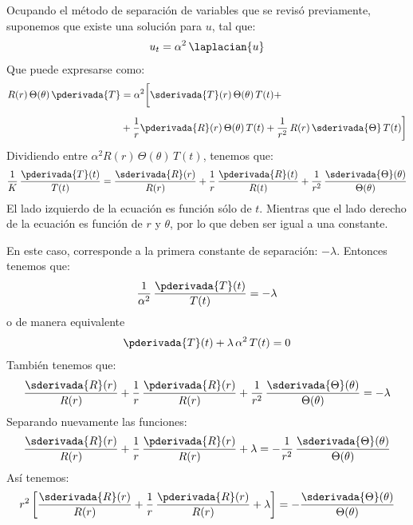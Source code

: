 Ocupando el método de separación de variables que se revisó previamente, suponemos que existe una solución para $u$, tal que:
\begin{align*}
u_{t} = \alpha^{2} \, \laplacian{u}
\end{align*}
Que puede expresarse como:
\begin{align*}
R(r) \, \Theta (\theta) \, \pderivada{T} &= \alpha^{2} \bigg[ \sderivada{T} (r) \, \Theta (\theta) \, T(t) + \\[0.5em]
&+ \dfrac{1}{r} \pderivada{R} (r) \, \Theta(\theta) \, T(t) + \dfrac{1}{r^{2}} \, R(r) \, \sderivada{\Theta} \, T(t) \bigg]
\end{align*}
Dividiendo entre $\alpha^{2} R(r) \, \Theta (\theta) \, T(t)$, tenemos que:
\begin{align}
\dfrac{1}{K} \, \dfrac{\pderivada{T} (t)}{T (t)} = \dfrac{\sderivada{R} (r)}{R (r)} + \dfrac{1}{r} \, \dfrac{\pderivada{R} (t)}{R (t)} + \dfrac{1}{r^{2}} \, \dfrac{\sderivada{\Theta} (\theta)}{\Theta (\theta)}
\label{eq:ecuacion_K01}
\end{align}
El lado izquierdo de la ecuación es función sólo de $t$. Mientras que el lado derecho de la ecuación es función de $r$ y $\theta$, por lo que deben ser igual a una constante.
\par
En este caso, corresponde a la primera constante de separación: $- \lambda$. Entonces tenemos que:
\begin{align*}
\dfrac{1}{\alpha^{2}} \, \dfrac{\pderivada{T} (t)}{T (t)} = - \lambda
\end{align*}
o de manera equivalente
\begin{align}
\pderivada{T}(t) + \lambda \, \alpha^{2} \, T(t) = 0
\label{eq:ecuacion_K02}    
\end{align}
También tenemos que:
\begin{align*}
\dfrac{\sderivada{R} (r)}{R (r)} + \dfrac{1}{r} \, \dfrac{\pderivada{R} (r)}{R (r)} + \dfrac{1}{r^{2}} \, \dfrac{\sderivada{\Theta} (\theta)}{\Theta (\theta)} = - \lambda
\end{align*}
Separando nuevamente las funciones:
\begin{align*}
\dfrac{\sderivada{R} (r)}{R (r)} + \dfrac{1}{r} \, \dfrac{\pderivada{R} (r)}{R (r)} + \lambda = - \dfrac{1}{r^{2}} \, \dfrac{\sderivada{\Theta} (\theta)}{\Theta (\theta)}
\end{align*}
Así tenemos:
\begin{align}
r^{2} \left[ \dfrac{\sderivada{R} (r)}{R (r)} + \dfrac{1}{r} \, \dfrac{\pderivada{R} (r)}{R (r)} + \lambda \right] = - \dfrac{\sderivada{\Theta} (\theta)}{\Theta (\theta)}
\label{eq:ecuacion_K03}    
\end{align}
